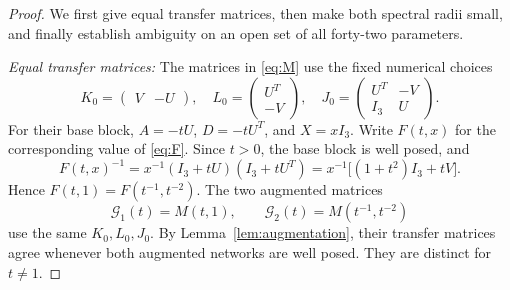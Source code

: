 \documentclass[letterpaper,10pt,conference]{ieeeconf}
\begin{document}
\begin{proof}
We first give equal transfer matrices, then make both spectral radii small,
and finally establish ambiguity on an open set of all forty-two
parameters.

\emph{Equal transfer matrices:}
The matrices in \eqref{eq:M} use the fixed numerical choices
\begin{equation}\label{eq:controller}
 K_0=\begin{pmatrix}V&-U\end{pmatrix},\quad
 L_0=\begin{pmatrix}U^T\\-V\end{pmatrix},\quad
 J_0=\begin{pmatrix}U^T&-V\\I_3&U\end{pmatrix}.
\end{equation}
For their base block, \(A=-tU\), \(D=-tU^T\), and \(X=xI_3\).
Write \(F(t,x)\) for the corresponding value of \eqref{eq:F}.
Since \(t>0\), the base block is well posed, and
\begin{equation}\label{eq:symmetric}
 F(t,x)^{-1}
 =x^{-1}(I_3+tU)(I_3+tU^T)
 =x^{-1}\big[(1+t^2)I_3+tV\big].
\end{equation}
Hence \(F(t,1)=F(t^{-1},t^{-2})\).
The two augmented matrices
\begin{equation}\label{eq:pair}
 \mathcal G_1(t)=M(t,1),\qquad
 \mathcal G_2(t)=M(t^{-1},t^{-2})
\end{equation}
use the same \(K_0,L_0,J_0\). By Lemma~\ref{lem:augmentation}, their
transfer matrices agree whenever both augmented networks are well posed.
They are distinct for \(t\ne1\).


\end{proof}
\end{document}
